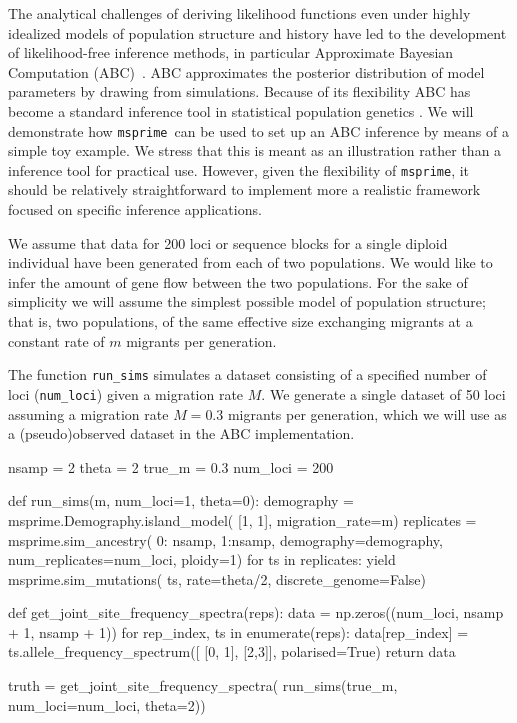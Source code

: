 \documentclass[graybox]{svmult}
\newcommand{\msprime}[0]{\texttt{msprime}}
\begin{document}
The analytical challenges of deriving likelihood functions even under
highly idealized models of population structure and history have led to
the development of likelihood-free inference methods, in particular
Approximate Bayesian Computation (ABC)~\citep{Beaumont2002}.
ABC approximates the posterior distribution of model parameters by drawing from
simulations. Because of its flexibility ABC has become a standard
inference tool in statistical population genetics \citep[see][for a review]{csillery2010approximate}.
We will demonstrate how \msprime\ can be used to set up an ABC inference
by means of a simple toy example. We stress that this is meant as an
illustration rather than a inference tool for practical use. However,
given the flexibility of \msprime, it should be
relatively straightforward to implement more a realistic framework focused
on specific inference applications.

We assume that data for 200 loci or sequence blocks
for a single diploid individual have been generated
from each of two populations. We would like to infer the amount of gene
flow between the two populations. For the sake of simplicity we will
assume the simplest possible model of population structure; that is, two
populations, of the same effective size exchanging migrants at a
constant rate of $m$ migrants per generation.

The function \texttt{run\_sims} simulates a dataset consisting of a
specified number of loci (\texttt{num\_loci}) given a migration rate
\(M\). We generate a single dataset of 50 loci assuming a migration rate
\(M=0.3\) migrants per generation, which we will use as a (pseudo)observed dataset in the ABC
implementation.

\begin{pythoncode}
nsamp = 2
theta = 2
true_m = 0.3
num_loci = 200

def run_sims(m, num_loci=1, theta=0):
    demography = msprime.Demography.island_model(
        [1, 1], migration_rate=m)
    replicates = msprime.sim_ancestry(
        {0: nsamp, 1:nsamp}, demography=demography,
        num_replicates=num_loci, ploidy=1)
    for ts in replicates:
        yield msprime.sim_mutations(
            ts, rate=theta/2, discrete_genome=False)

def get_joint_site_frequency_spectra(reps):
    data = np.zeros((num_loci, nsamp + 1, nsamp + 1))
    for rep_index, ts in enumerate(reps):
        data[rep_index] = ts.allele_frequency_spectrum([
            [0, 1], [2,3]], polarised=True)
    return data

truth = get_joint_site_frequency_spectra(
    run_sims(true_m, num_loci=num_loci, theta=2))
\end{pythoncode}
\end{document}
